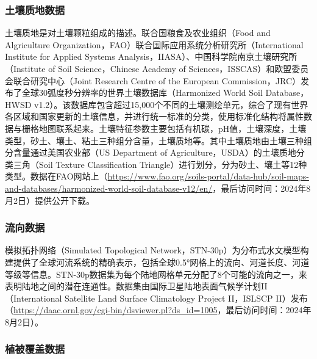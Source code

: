 \subsubsection{土壤质地数据}

土壤质地是对土壤颗粒组成的描述。联合国粮食及农业组织（Food and Algriculture Organization，FAO）联合国际应用系统分析研究所（International Institute for Applied Systems Analysis，IIASA）、中国科学院南京土壤研究所（Institute of Soil Science，Chinese Academy of Sciences，ISSCAS）和欧盟委员会联合研究中心（Joint Research Centre of the European Commission，JRC）发布了全球30弧度秒分辨率的世界土壤数据库（Harmonized World Soil Database，HWSD v1.2）。该数据库包含超过15,000个不同的土壤测绘单元，综合了现有世界各区域和国家更新的土壤信息，并进行统一标准的分类，使用标准化结构将属性数据与栅格地图联系起来。土壤特征参数主要包括有机碳，pH值，土壤深度，土壤类型，砂土、壤土、粘土三种组分含量，土壤质地等。其中土壤质地由土壤三种组分含量通过美国农业部（US Department of Agriculture，USDA）的土壤质地分类三角（Soil Texture Classification Triangle）进行划分，分为砂土、壤土等12种类型\cite{moreno-marotoEvaluationUSDASoil2022}。数据在FAO网站上（\href{https://www.fao.org/soils-portal/data-hub/soil-maps-and-databases/harmonized-world-soil-database-v12/en/}{https://www.fao.org/soils-portal/data-hub/soil-maps-and-databases/harmonized-world-soil-database-v12/en/}，最后访问时间：2024年8月2日）提供公开下载。

\subsubsection{流向数据}

模拟拓扑网络（Simulated Topological Network，STN-30p）为分布式水文模型构建提供了全球河流系统的精确表示，包括全球0.5°网格上的流向、河道长度、河道等级等信息。STN-30p数据集为每个陆地网格单元分配了8个可能的流向之一，来表明陆地之间的潜在连通性。数据集由国际卫星陆地表面气候学计划II（International Satellite Land Surface Climatology Project II，ISLSCP II）发布（\href{https://daac.ornl.gov/cgi-bin/dsviewer.pl?ds_id=1005}{https://daac.ornl.gov/cgi-bin/dsviewer.pl?ds\_id=1005}，最后访问时间：2024年8月2日）。

\subsubsection{植被覆盖数据}

